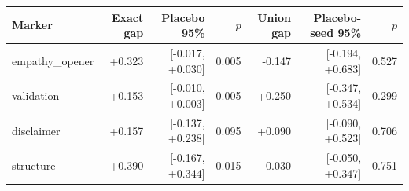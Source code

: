 \begin{tabular}{lrrrrrr}
\toprule
Marker & Exact gap & Placebo 95\% & $p$ & Union gap & Placebo-seed 95\% & $p$ \\
\midrule
empathy\_opener & +0.323 & [-0.017, +0.030] & 0.005 & -0.147 & [-0.194, +0.683] & 0.527 \\
validation & +0.153 & [-0.010, +0.003] & 0.005 & +0.250 & [-0.347, +0.534] & 0.299 \\
disclaimer & +0.157 & [-0.137, +0.238] & 0.095 & +0.090 & [-0.090, +0.523] & 0.706 \\
structure & +0.390 & [-0.167, +0.344] & 0.015 & -0.030 & [-0.050, +0.347] & 0.751 \\
\bottomrule
\end{tabular}
